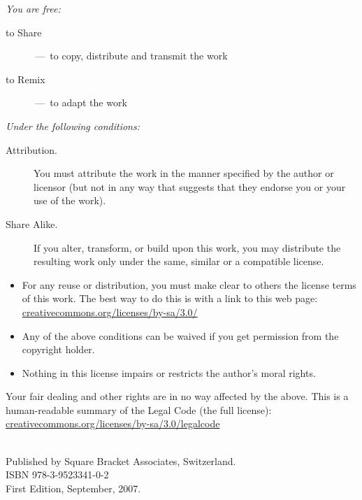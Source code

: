 \documentclass[a4paper,10pt,twoside]{book}
\begin{document}
\begin{footnotesize}
\emph{You are free:}
\begin{description}
  \item[to Share] \,---\, to copy, distribute and transmit the work
  \item[to Remix] \,---\, to adapt the work
\end{description}
\emph{Under the following conditions:}
\begin{description}
  \item[Attribution.] You must attribute the work in the manner specified by the author or licensor (but not in any way that suggests that they endorse you or your use of the work).
  \item[Share Alike.] If you alter, transform, or build upon this work, you may distribute the resulting work only under the same, similar or a compatible license.
\end{description}
\begin{itemize}
  \item For any reuse or distribution, you must make clear to others the license terms of this work. The best way to do this is with a link to this web page:
  \url{creativecommons.org/licenses/by-sa/3.0/}
  \item Any of the above conditions can be waived if you get permission from the copyright holder.
  \item Nothing in this license impairs or restricts the author's moral rights.
\end{itemize}
\quad
\parbox{\textwidth-2cm-1em}{
	Your fair dealing and other rights are in no way affected by the above.
	This is a human-readable summary of the Legal Code (the full license):\\
	\url{creativecommons.org/licenses/by-sa/3.0/legalcode}}\\[1cm]
Published by Square Bracket Associates, Switzerland. \sba\\
ISBN 978-3-9523341-0-2\\
First Edition, September, 2007.
\end{footnotesize}
\vfill
%
\tableofcontents
\sloppy %

\mainmatter
\end{document}
